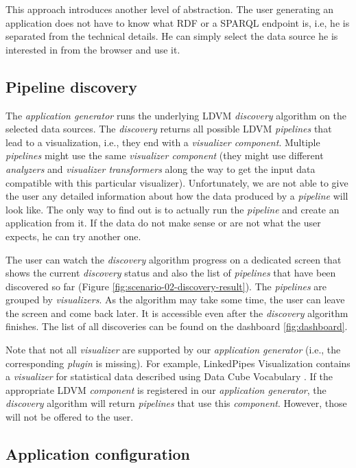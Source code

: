 This approach introduces another level of abstraction. The user generating an application does not have to know what RDF or a SPARQL endpoint is, i.e, he is separated from the technical details. He can simply select the data source he is interested in from the browser and use it.

\subsection{Pipeline discovery}

The \emph{application generator} runs the underlying LDVM \emph{discovery} algorithm on the selected data sources. The \emph{discovery} returns all possible LDVM \emph{pipelines} that lead to a visualization, i.e., they end with a \emph{visualizer component}. Multiple \emph{pipelines} might use the same \emph{visualizer component} (they might use different \emph{analyzers} and \emph{visualizer transformers} along the way to get the input data compatible with this particular visualizer). Unfortunately, we are not able to give the user any detailed information about how the data produced by a \emph{pipeline} will look like. The only way to find out is to actually run the \emph{pipeline} and create an application from it. If the data do not make sense or are not what the user expects, he can try another one.

The user can watch the \emph{discovery} algorithm progress on a dedicated screen that shows the current \emph{discovery} status and also the list of \emph{pipelines} that have been discovered so far (Figure \ref{fig:scenario-02-discovery-result}). The \emph{pipelines} are grouped by \emph{visualizers}. As the algorithm may take some time, the user can leave the screen and come back later. It is accessible even after the \emph{discovery} algorithm finishes. The list of all discoveries can be found on the dashboard \ref{fig:dashboard}.

Note that not all \emph{visualizer} are supported by our \emph{application generator} (i.e., the corresponding \emph{plugin} is missing). For example, LinkedPipes Visualization contains a \emph{visualizer} for statistical data described using Data Cube Vocabulary \cite{datacube_vocabulary}. If the appropriate LDVM \emph{component} is registered in our \emph{application generator}, the \emph{discovery} algorithm will return \emph{pipelines} that use this \emph{component}. However, those will not be offered to the user.

\subsection{Application configuration}


